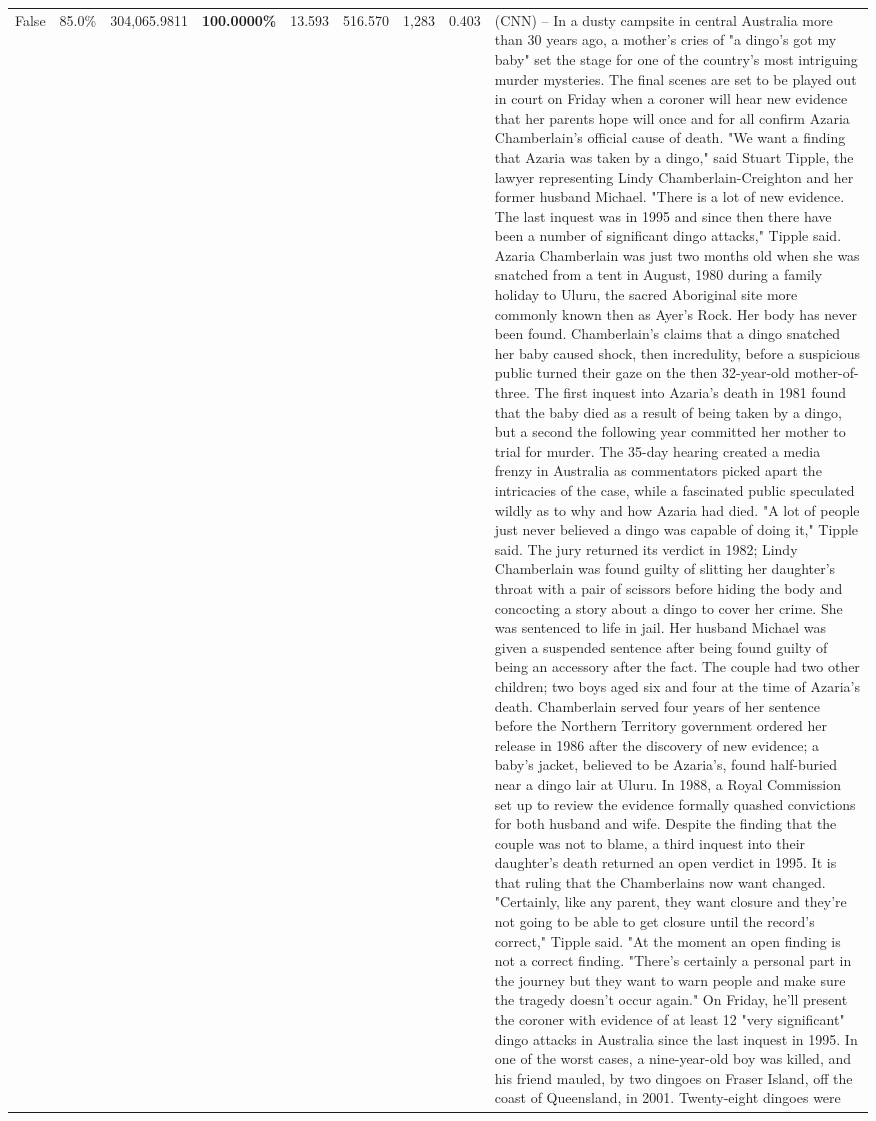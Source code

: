 \begin{table}[H]
\begin{tabular}{lllrlllll}
False & 85.0\% & 304,065.9811 & \bfseries \color{red} 100.0000\% & 13.593 & 516.570 & 1,283 & 0.403 & (CNN) -- In a dusty campsite in central Australia more than 30 years ago, a mother's cries of "a dingo's got my baby" set the stage for one of the country's most intriguing murder mysteries. The final scenes are set to be played out in court on Friday when a coroner will hear new evidence that her parents hope will once and for all confirm Azaria Chamberlain's official cause of death. "We want a finding that Azaria was taken by a dingo," said Stuart Tipple, the lawyer representing Lindy Chamberlain-Creighton and her former husband Michael. "There is a lot of new evidence. The last inquest was in 1995 and since then there have been a number of significant dingo attacks," Tipple said. Azaria Chamberlain was just two months old when she was snatched from a tent in August, 1980 during a family holiday to Uluru, the sacred Aboriginal site more commonly known then as Ayer's Rock. Her body has never been found. Chamberlain's claims that a dingo snatched her baby caused shock, then incredulity, before a suspicious public turned their gaze on the then 32-year-old mother-of-three. The first inquest into Azaria's death in 1981 found that the baby died as a result of being taken by a dingo, but a second the following year committed her mother to trial for murder. The 35-day hearing created a media frenzy in Australia as commentators picked apart the intricacies of the case, while a fascinated public speculated wildly as to why and how Azaria had died. "A lot of people just never believed a dingo was capable of doing it," Tipple said. The jury returned its verdict in 1982; Lindy Chamberlain was found guilty of slitting her daughter's throat with a pair of scissors before hiding the body and concocting a story about a dingo to cover her crime. She was sentenced to life in jail. Her husband Michael was given a suspended sentence after being found guilty of being an accessory after the fact. The couple had two other children; two boys aged six and four at the time of Azaria's death. Chamberlain served four years of her sentence before the Northern Territory government ordered her release in 1986 after the discovery of new evidence; a baby's jacket, believed to be Azaria's, found half-buried near a dingo lair at Uluru. In 1988, a Royal Commission set up to review the evidence formally quashed convictions for both husband and wife. Despite the finding that the couple was not to blame, a third inquest into their daughter's death returned an open verdict in 1995. It is that ruling that the Chamberlains now want changed. "Certainly, like any parent, they want closure and they're not going to be able to get closure until the record's correct," Tipple said. "At the moment an open finding is not a correct finding. "There's certainly a personal part in the journey but they want to warn people and make sure the tragedy doesn't occur again." On Friday, he'll present the coroner with evidence of at least 12 "very significant" dingo attacks in Australia since the last inquest in 1995. In one of the worst cases, a nine-year-old boy was killed, and his friend mauled, by two dingoes on Fraser Island, off the coast of Queensland, in 2001. Twenty-eight dingoes were 
\end{tabular}
\end{table}
